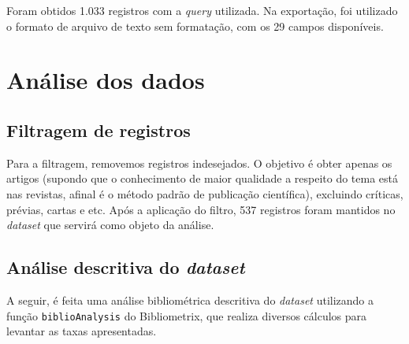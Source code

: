 Foram obtidos 1.033 registros com a \textit{query} utilizada. Na exportação, foi utilizado o formato de arquivo de texto sem formatação, com os 29 campos disponíveis.

\section{Análise dos dados}

\subsection{Filtragem de registros}

Para a filtragem, removemos registros indesejados. O objetivo é obter apenas os artigos (supondo que o conhecimento de maior qualidade a respeito do tema está nas revistas, afinal é o método padrão de publicação científica), excluindo críticas, prévias, cartas e etc. Após a aplicação do filtro, 537 registros foram mantidos no \textit{dataset} que servirá como objeto da análise.

\subsection{Análise descritiva do \textit{dataset} }

A seguir, é feita uma análise bibliométrica descritiva do \textit{dataset} utilizando a função \texttt{biblioAnalysis} do Bibliometrix, que realiza diversos cálculos para levantar as taxas apresentadas.

